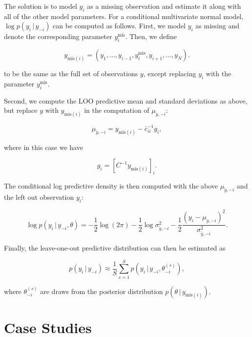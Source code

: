 \documentclass[english,,doc,floatsintext]{apa6}
\theoremstyle{definition}
\theoremstyle{definition}
\theoremstyle{definition}
\theoremstyle{remark}
\begin{document}
The solution is to model \(y_i\) as a missing observation and estimate
it along with all of the other model parameters. For a conditional
multivariate normal model, \(\log p(y_i\,|\,y_{-i})\) can be computed as
follows. First, we model \(y_i\) as missing and denote the corresponding
parameter \(y_i^{\mathrm{mis}}\). Then, we define

\begin{equation}
y_{\mathrm{mis}(i)} = (y_1, \ldots, y_{i-1}, y_i^{\mathrm{mis}}, y_{i+1}, \ldots, y_N).
\end{equation}

to be the same as the full set of observations \(y\), except replacing
\(y_i\) with the parameter \(y_i^{\mathrm{mis}}\).

Second, we compute the LOO predictive mean and standard deviations as
above, but replace \(y\) with \(y_{\mathrm{mis}(i)}\) in the computation
of \(\mu_{\tilde{y},-i}\):

\begin{equation}
\mu_{\tilde{y},-i} = y_{{\mathrm{mis}}(i)}-\bar{c}_{ii}^{-1}g_i,
\end{equation}

where in this case we have

\begin{equation}
g_i = \left[ C^{-1} y_{\mathrm{mis}(i)} \right]_i.
\end{equation}

The conditional log predictive density is then computed with the above
\(\mu_{\tilde{y},-i}\) and the left out observation \(y_i\):

\begin{equation}
  \log p(y_i\,|\,y_{-i},\theta)
  = - \frac{1}{2}\log(2\pi)
  - \frac{1}{2}\log \sigma^2_{\tilde{y},-i}
  - \frac{1}{2}\frac{(y_i-\mu_{\tilde{y},-i})^2}{\sigma^2_{\tilde{y},-i}}.
\end{equation}

Finally, the leave-one-out predictive distribution can then be estimated
as

\begin{equation}
 p(y_i\,|\,y_{-i}) \approx \frac{1}{S} \sum_{s=1}^S p(y_i\,|\,y_{-i}, \theta_{-i}^{(s)}),
\end{equation}

where \(\theta_{-i}^{(s)}\) are draws from the posterior distribution
\(p(\theta\,|\,y_{\mathrm{mis}(i)})\).

\hypertarget{case-studies}{%
\section{Case Studies}\label{case-studies}}
\end{document}
